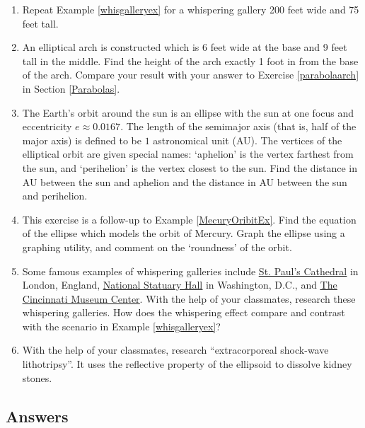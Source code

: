 \documentclass{ximera}
\begin{document}
\begin{enumerate}
\setcounter{enumi}{\value{HW}}

\item  Repeat Example \ref{whisgalleryex} for a whispering gallery 200 feet wide and 75 feet tall.

\item \label{ellipsearchex} An elliptical arch is constructed which is 6 feet wide at the base and 9 feet tall in the middle. Find the height of the arch exactly 1 foot in from the base of the arch. Compare your result with your answer to Exercise \ref{parabolaarch} in Section \ref{Parabolas}.

\item The Earth's orbit around the sun is an ellipse with the sun at one focus and eccentricity $e \approx 0.0167$.  The length of the semimajor axis (that is, half of the major axis) is defined to be $1$ astronomical unit (AU).  The vertices of the elliptical orbit are given special names: `aphelion' is the vertex farthest from the sun, and  `perihelion' is the vertex closest to the sun.  Find the distance in AU between the sun and aphelion and the distance in AU between the sun and perihelion.

\item  \label{MercuryOrbitGraph}  This exercise is a follow-up to Example \ref{MecuryOribitEx}.  Find the equation of the ellipse which models the orbit of Mercury.  Graph the ellipse using a graphing utility, and comment on the `roundness' of the orbit.


\item Some famous examples of whispering galleries include \href{http://www.stpauls.co.uk/}{\underline{St. Paul's Cathedral}} in London, England, \href{http://www.aoc.gov/cc/capitol/nat_stat_hall.cfm}{\underline{National Statuary Hall}} in Washington, D.C.,  and \href{http://www.cincymuseum.org/}{\underline{The Cincinnati Museum Center}}. With the help of your classmates, research these whispering galleries.  How does the whispering effect compare and contrast with the scenario in Example  \ref{whisgalleryex}?

\item With the help of your classmates, research ``extracorporeal shock-wave lithotripsy''.  It uses the reflective property of the ellipsoid to dissolve kidney stones.

\end{enumerate}

\newpage

\subsection{Answers}
\end{document}
